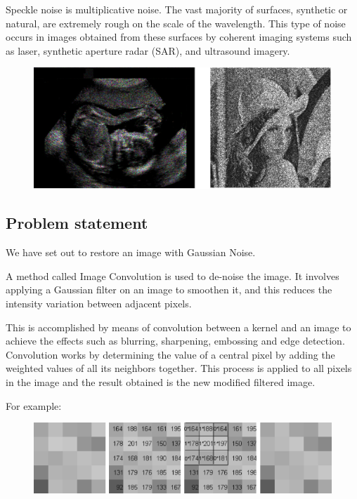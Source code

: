 \documentclass[paper=a4, fontsize=11pt]{scrartcl} %
\numberwithin{equation}{section} %
\numberwithin{figure}{section} %
\numberwithin{table}{section} %
\begin{document}
\begin{enumerate}
  Speckle noise is multiplicative noise. The vast majority of surfaces, synthetic or natural, are extremely rough on the scale of the wavelength. This type of noise occurs in images obtained from these surfaces by coherent imaging systems such as laser, synthetic aperture radar (SAR), and ultrasound imagery.
  \begin{figure}[H]
	\centering
	\includegraphics[scale=0.3]{"speckle"}
        \label{speckle}
  \end{figure}
\end{enumerate}
  
\subsection{Problem statement}
We have set out to restore an image with Gaussian Noise.

A method called Image Convolution is used to de-noise the image. It involves applying a Gaussian filter on an image to smoothen it, and this reduces the intensity variation between adjacent pixels.

 This is accomplished by means of convolution between a kernel and an image to achieve the effects such as blurring, sharpening, embossing and edge detection.
 Convolution works by determining the value of a central pixel by adding the weighted values of all its neighbors together. This process is applied to all pixels in the image and the result obtained is the new modified filtered image.

For example:
 
\begin{figure}[H]
	\centering
	\includegraphics[scale=0.5]{"greyscale"}
        \label{greyscale}
\end{figure}
 
\end{document}
